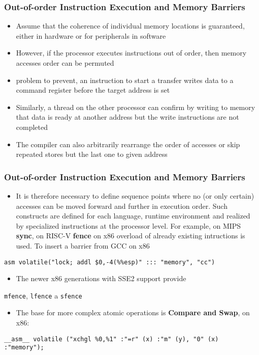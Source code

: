 \documentclass{beamer}
\begin{document}
\begin{frame}[fragile]
\frametitle{Out-of-order Instruction Execution and Memory Barriers}

\begin{itemize}
\item Assume that the coherence of individual memory locations is guaranteed, either in hardware or for peripherals in software
\item However, if the processor executes instructions out of order, then memory accesses order can be permuted
\item problem to prevent, an instruction to start a transfer writes data to a command register before the target address is set
\item Similarly, a thread on the other processor can confirm by writing to memory that data is ready at another address but the write instructions are not completed
\item The compiler can also arbitrarily rearrange the order of accesses or skip repeated stores but the last one to given address

\end{itemize}

\end{frame}

\begin{frame}[fragile]
\frametitle{Out-of-order Instruction Execution and Memory Barriers}

\begin{itemize}
 \item It is therefore necessary to define sequence points where no (or only certain) accesses can be moved forward and further in execution order. Such constructs are defined for each language, runtime environment
and realized by specialized instructions at the processor level. For example, on MIPS \textbf{sync}, on RISC-V \textbf{fence} on x86 overload of already existing intructions is used. To insert a barrier from GCC on x86
\end{itemize}

\begin{verbatim}
asm volatile("lock; addl $0,-4(%%esp)" ::: "memory", "cc")
\end{verbatim}

\begin{itemize}
\item The newer x86 generations with SSE2 support provide
\end{itemize}

\texttt{mfence}, \texttt{lfence} a \texttt{sfence}

\begin{itemize}
\item The base for more complex atomic operations is \textbf{Compare and Swap}, on x86:
\end{itemize}

\begin{verbatim}
__asm__ volatile ("xchgl %0,%1" :"=r" (x) :"m" (y), "0" (x) :"memory");
\end{verbatim}
\end{frame}
\end{document}
